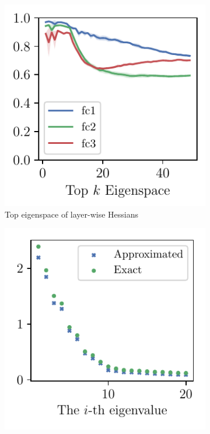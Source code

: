 \begin{figure}[ht]
\begin{subfigure}[b]{0.24\columnwidth}
    \captionsetup{justification=centering}
    \includegraphics[width=\columnwidth]{Figures/ApproxQuality/FC2_fixlr/sample_kron_decomp_traceoverlap_d80_MNIST_Exp1_FC2_fixlr0.01Average_E-1_narrow.pdf}
    \vspace{-0.2in}
    \caption{Top eigenspace of layer-wise Hessians}
    \label{fig:overlap_approx}
\end{subfigure}
\begin{subfigure}[b]{0.24\columnwidth}
    \captionsetup{justification=centering}
    \includegraphics[width=\columnwidth]{Figures/ApproxQuality/FC2_fixlr/MNIST_Exp1_FC2_fixlr0.01_fulleigenval_approx.pdf}

\end{subfigure}
\end{figure}

